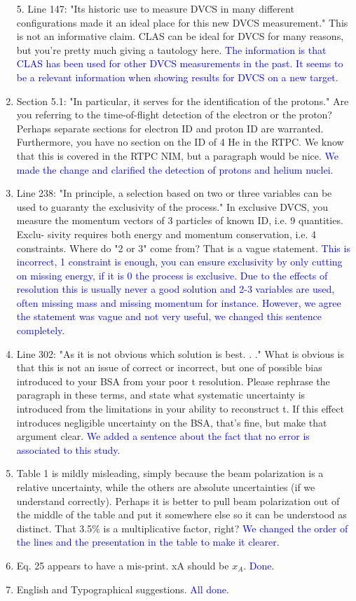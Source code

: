 \documentclass[a4paper,11pt,twoside]{article}
\begin{document}
\begin{enumerate}
5. Line 147: "Its historic use to measure DVCS in many different configurations made it an ideal place for this
new DVCS measurement."
This is not an informative claim. CLAS can be ideal for DVCS for many reasons, but you're pretty much
giving a tautology here.
   \textcolor{blue}{The information is that CLAS has been used for other DVCS measurements in the past. It seems
to be a relevant information when showing results for DVCS on a new target.}

\item  Section 5.1: "In particular, it serves for the identification of the protons."
Are you referring to the time-of-flight detection of the electron or the proton? Perhaps separate sections for
electron ID and proton ID are warranted. Furthermore, you have no section on the ID of 4 He in the RTPC.
We know that this is covered in the RTPC NIM, but a paragraph would be nice.
   \textcolor{blue}{We made the change and clarified the detection of protons and helium nuclei.}

\item  Line 238: "In principle, a selection based on two or three variables can be used to guaranty the exclusivity of
the process."
In exclusive DVCS, you measure the momentum vectors of 3 particles of known ID, i.e. 9 quantities. Exclu-
sivity requires both energy and momentum conservation, i.e. 4 constraints. Where do "2 or 3" come from?
That is a vague statement.
   \textcolor{blue}{This is incorrect, 1 constraint is enough, you can ensure exclusivity by only cutting on missing 
energy, if it is 0 the process is exclusive. Due to the effects of resolution this is usually never a good solution
and 2-3 variables are used, often missing mass and missing momentum for instance. However, we agree the statement was 
vague and not very useful, we changed this sentence completely.}

\item  Line 302: "As it is not obvious which solution is best. . ."
What is obvious is that this is not an issue of correct or incorrect, but one of possible bias introduced to your
BSA from your poor t resolution. Please rephrase the paragraph in these terms, and state what systematic
uncertainty is introduced from the limitations in your ability to reconstruct t. If this effect introduces negligible
uncertainty on the BSA, that's fine, but make that argument clear.
   \textcolor{blue}{We added a sentence about the fact that no error is associated to 
this study.}

\item  Table 1 is mildly misleading, simply because the beam polarization is a relative uncertainty, while the others
are absolute uncertainties (if we understand correctly). Perhaps it is better to pull beam polarization out of
the middle of the table and put it somewhere else so it can be understood as distinct.
That 3.5\% is a multiplicative factor, right?
   \textcolor{blue}{We changed the order of the lines and the presentation in the table to make it clearer.}

\item  Eq. 25 appears to have a mis-print. xA should be $x_A$.
   \textcolor{blue}{Done.}

\item  English and Typographical suggestions.
   \textcolor{blue}{All done.}

\end{enumerate}
\end{document}
